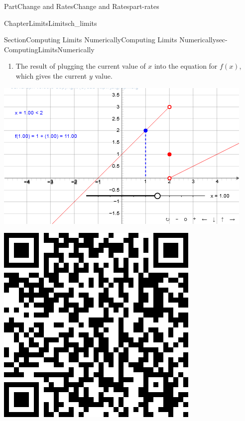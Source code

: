 \documentclass[oneside,10pt,]{tufte-book}
\numberwithin{equation}{chapter}
\begin{document}
\begin{partptx}{Part}{Change and Rates}{}{Change and Rates}{}{}{part-rates}
\begin{chapterptx}{Chapter}{Limits}{}{Limits}{}{}{ch_limits}
\begin{sectionptx}{Section}{Computing Limits Numerically}{}{Computing Limits Numerically}{}{}{sec-ComputingLimitsNumerically}
\begin{enumerate}
\item{}The result of plugging the current value of \(x\) into the equation for \(f(x)\), which gives the current \(y\) value.%
\end{enumerate}
%
\begin{sidebyside}{2}{0.075}{0.075}{0.17}%
\begin{sbspanel}{0.47}%
\includegraphics[width=\linewidth]{external/jsxgraph-limitnumerically.png}
\end{sbspanel}%
\begin{sbspanel}{0.21}%
\includegraphics[width=\linewidth]{generated/qrcode/sec-ComputingLimitsNumerically-4.png}

\end{sbspanel}
\end{sidebyside}
\end{sectionptx}
\end{chapterptx}
\end{partptx}
\end{document}
